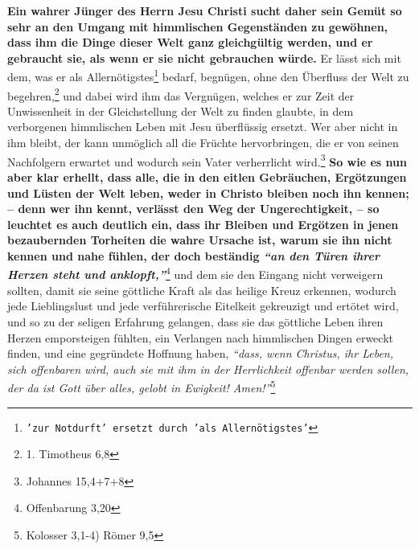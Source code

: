 \label{ref:16_05_weltliches}
\textbf{Ein wahrer Jünger des Herrn Jesu Christi sucht daher sein Gemüt so sehr
an den
Umgang mit himmlischen Gegenständen zu gewöhnen, dass ihm die Dinge dieser Welt
ganz gleichgültig werden, und er gebraucht sie, als wenn er sie nicht
gebrauchen würde.} Er lässt sich mit dem, was er als
Allernötigstes\footnote{\texttt{'zur Notdurft' ersetzt durch 'als
Allernötigstes'}} bedarf, begnügen, ohne
den Überfluss der Welt zu begehren,\footnote{1. Timotheus 6,8}
und dabei wird ihm das
Vergnügen, welches er zur Zeit der Unwissenheit in der Gleichstellung der Welt
zu finden glaubte, in dem verborgenen himmlischen Leben mit Jesu überflüssig
ersetzt. Wer aber nicht in ihm bleibt, der kann unmöglich all die Früchte
hervorbringen, die er von seinen Nachfolgern erwartet und wodurch sein Vater
verherrlicht wird.\footnote{Johannes 15,4+7+8}
\label{ref:16_05_weltliches_2}
\textbf{So wie es nun aber klar erhellt,
dass alle, die in den eitlen Gebräuchen, Ergötzungen und Lüsten der Welt leben,
weder in Christo bleiben noch ihn kennen; -- denn wer ihn kennt, verlässt den
Weg
der Ungerechtigkeit, -- so leuchtet es auch deutlich ein, dass ihr Bleiben und
Ergötzen in jenen bezaubernden Torheiten die wahre Ursache ist, warum sie ihn
nicht kennen und nahe fühlen, der doch beständig
\textit{"`an den Türen ihrer Herzen
steht und anklopft,"'}}\footnote{Offenbarung 3,20}
und dem sie den Eingang nicht
verweigern sollten, damit sie seine göttliche Kraft als das heilige Kreuz
erkennen, wodurch jede Lieblingslust und jede verführerische Eitelkeit
gekreuzigt und ertötet wird, und so zu der seligen
Erfahrung gelangen, dass sie
das göttliche Leben ihren Herzen emporsteigen fühlten, ein Verlangen nach
himmlischen Dingen erweckt finden, und eine gegründete Hoffnung haben,
\textit{"`dass,
wenn Christus, ihr Leben, sich offenbaren wird, auch sie mit ihm in der
Herrlichkeit offenbar werden sollen, der da ist Gott über alles, gelobt in
Ewigkeit! Amen!"'}\footnote{Kolosser 3,1-4) Römer 9,5}


